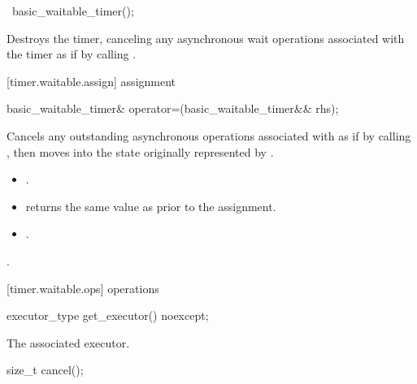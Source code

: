 %
\begin{itemdecl}
~basic_waitable_timer();
\end{itemdecl}

\begin{itemdescr}
\pnum
\effects Destroys the timer, canceling any asynchronous wait operations associated with the timer as if by calling .
\end{itemdescr}



[timer.waitable.assign]{ assignment}

%
\begin{itemdecl}
basic_waitable_timer& operator=(basic_waitable_timer&& rhs);
\end{itemdecl}

\begin{itemdescr}
\pnum
\effects Cancels any outstanding asynchronous operations associated with  as if by calling , then moves into  the state originally represented by .

\pnum
\postconditions 
\begin{itemize}
\item
{}.
\item
{} returns the same value as  prior to the assignment.
\item
{}.
\end{itemize}

\pnum
\returns {}.
\end{itemdescr}



[timer.waitable.ops]{ operations}

%
\begin{itemdecl}
executor_type get_executor() noexcept;
\end{itemdecl}

\begin{itemdescr}
\pnum
\returns The associated executor.
\end{itemdescr}

%
\begin{itemdecl}
size_t cancel();
\end{itemdecl}

